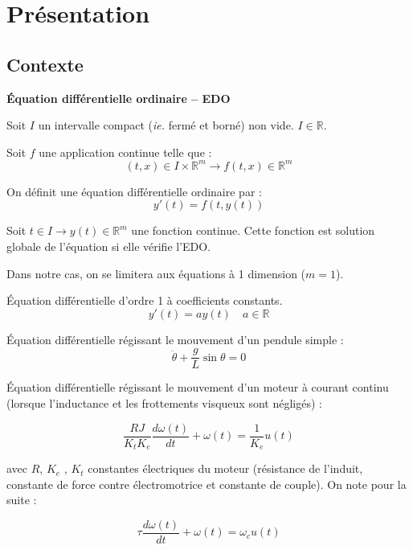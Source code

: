 \documentclass[10pt,fleqn]{article} %
\begin{document}







\section{Présentation}
\subsection{Contexte}

\begin{defi}
\textbf{Équation différentielle ordinaire -- EDO}

Soit $I$ un intervalle compact (\textit{ie.} fermé et borné) non vide. $I\in\mathbb{R}$. 

Soit $f$ une application continue telle que : 
$$
(t,x)\in I \times \mathbb{R}^m \rightarrow f(t,x)\in \mathbb{R}^m 
$$

On définit une équation différentielle ordinaire par :
$$
y'(t)=f\left( t,y(t)\right)
$$

Soit $t\in I \rightarrow y(t) \in \mathbb{R}^m$ une fonction continue. Cette fonction est solution globale de l'équation si elle vérifie l'EDO. 
\end{defi}

\begin{rem}
Dans notre cas, on se limitera aux équations à 1 dimension ($m=1$).
\end{rem}
\begin{exemple}
Équation différentielle d'ordre 1 à coefficients constants. 
$$
y'(t)=ay(t)\quad a\in \mathbb{R}
$$

Équation différentielle régissant le mouvement d'un pendule simple :
$$
\ddot{\theta} + \dfrac{g}{L}\sin\theta=0
$$

Équation différentielle régissant le mouvement d'un moteur à courant continu (lorsque l'inductance et les frottements visqueux sont négligés) :

$$
\dfrac{RJ}{K_t K_e} \dfrac{d\omega(t)}{dt} + \omega(t)= \dfrac{1}{K_e} u(t)
$$

avec $R$, $K_e$ , $K_t$ constantes électriques du moteur (résistance de l’induit,
constante de force contre électromotrice et constante de couple).
On note pour la suite : 

$$
\tau \dfrac{d\omega(t)}{dt} + \omega(t)= \omega_c u(t)
$$

\end{exemple}
\end{document}
